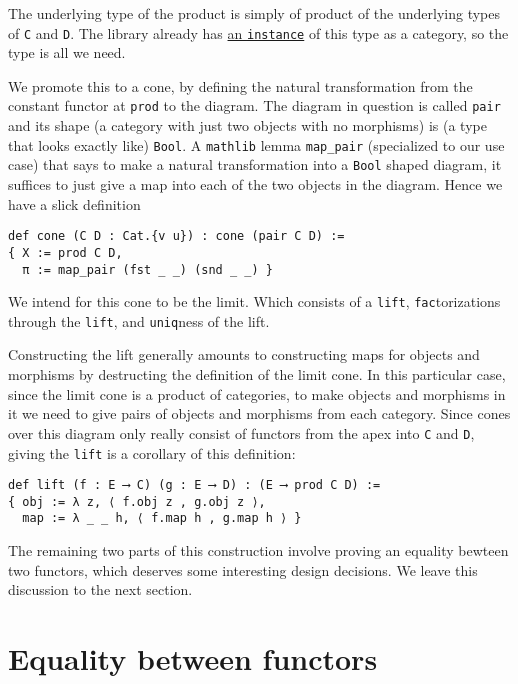 \documentclass{article}
\newcommand{\<}{\langle}
\renewcommand{\>}{\rangle}
\theoremstyle{definitionstyle}
\theoremstyle{exercisestyle}
\theoremstyle{remarkstyle}
\begin{document}
The underlying type of the product is simply of product
of the underlying types of \texttt{C} and \texttt{D}.
The library already has \href{https://leanprover-community.github.io/mathlib_docs/category_theory/products/basic.html}{an \texttt{instance}}
of this type as a category, so the type is all we need.

We promote this to a cone, by defining the natural transformation from
the constant functor at \texttt{prod} to the diagram.
The diagram in question is called \texttt{pair} and its shape
(a category with just two objects with no morphisms) is (a type that looks exactly like) \texttt{Bool}.
A \texttt{mathlib} lemma \texttt{map\_pair} (specialized to our use case) that says to make a
natural transformation into a \texttt{Bool} shaped diagram,
it suffices to just give a map into each of the two objects in the diagram.
Hence we have a slick definition

\begin{lstlisting}
def cone (C D : Cat.{v u}) : cone (pair C D) :=
{ X := prod C D,
  π := map_pair (fst _ _) (snd _ _) } \end{lstlisting}

We intend for this cone to be the limit.
Which consists of a \texttt{lift}, \texttt{fac}torizations through the \texttt{lift},
and \texttt{uniq}ness of the lift.

Constructing the lift generally amounts to constructing maps for objects and morphisms
by destructing the definition of the limit cone.
In this particular case, since the limit cone is a product of categories,
to make objects and morphisms in it we need to give pairs of objects
and morphisms from each category.
Since cones over this diagram only really consist of functors from the apex
into \texttt{C} and \texttt{D}, giving the \texttt{lift} is a corollary of this definition:

\begin{lstlisting}
def lift (f : E ⟶ C) (g : E ⟶ D) : (E ⟶ prod C D) :=
{ obj := λ z, ⟨ f.obj z , g.obj z ⟩,
  map := λ _ _ h, ⟨ f.map h , g.map h ⟩ }\end{lstlisting}

The remaining two parts of this construction involve proving an equality bewteen two functors,
which deserves some interesting design decisions.
We leave this discussion to the next section.

\section{Equality between functors}
\end{document}
